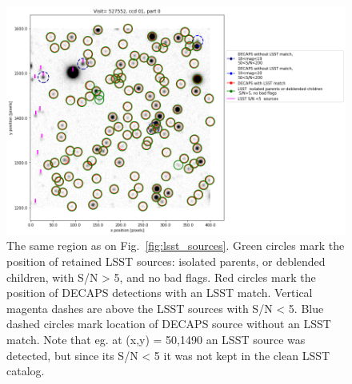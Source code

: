 \documentclass[DM,lsstdraft,toc,usenatbib]{lsstdoc}
\begin{document}
\begin{figure}
\begin{centering}
\includegraphics[width=1.0\columnwidth]{figs/visit_527552_ccd_1_lowSN.png}
\caption{The same region as on Fig.~\ref{fig:lsst_sources}. Green circles mark the position of retained LSST sources: isolated parents, or deblended children, with  S/N > 5, and no bad flags. Red circles mark the position of DECAPS detections with an LSST match. Vertical magenta dashes are above the LSST sources with S/N < 5.   Blue dashed circles mark location of DECAPS source without an LSST match. Note that eg. at (x,y) = 50,1490  an LSST source was detected, but since its  S/N < 5 it was not kept in the clean LSST catalog.   }
\label{fig:lsst_decaps_sources}
\end{centering}
\end{figure} 
\end{document}
